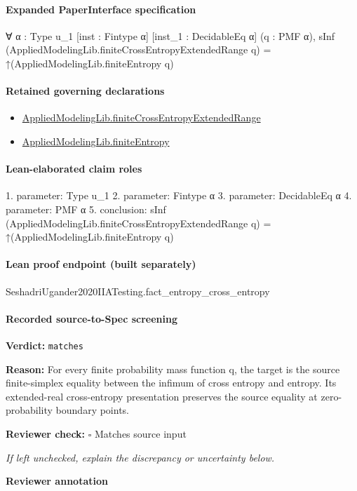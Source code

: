 \documentclass[10pt]{article}
\newcommand{\reviewerbox}{%
  \par\noindent\fbox{\parbox{0.96\linewidth}{\rule{0pt}{0.38in}}}\par
}
\newcommand{\reviewmatch}[1]{%
  \par\noindent\textbf{Reviewer check:} $\square$\; #1\par
  \noindent\emph{If left unchecked, explain the discrepancy or uncertainty below.}\par
}
\begin{document}
\paragraph{Expanded PaperInterface specification}
\begin{ReviewVerbatim}
∀ {α : Type u_1} [inst : Fintype α] [inst_1 : DecidableEq α] (q : PMF α),
  sInf (AppliedModelingLib.finiteCrossEntropyExtendedRange q) = ↑(AppliedModelingLib.finiteEntropy q)
\end{ReviewVerbatim}

\paragraph{Retained governing declarations}
\begin{itemize}\raggedright
\item \hyperlink{library-prerequisite-71929458e0903ffd}{Applied\allowbreak{}Modeling\allowbreak{}Lib.\allowbreak{}finite\allowbreak{}Cross\allowbreak{}Entropy\allowbreak{}Extended\allowbreak{}Range}
\item \hyperlink{library-prerequisite-99c551a488e46a7c}{Applied\allowbreak{}Modeling\allowbreak{}Lib.\allowbreak{}finite\allowbreak{}Entropy}
\end{itemize}
\paragraph{Lean-elaborated claim roles}\begin{ReviewVerbatim}
1. parameter: Type u_1
2. parameter: Fintype α
3. parameter: DecidableEq α
4. parameter: PMF α
5. conclusion: sInf (AppliedModelingLib.finiteCrossEntropyExtendedRange q) = ↑(AppliedModelingLib.finiteEntropy q)
\end{ReviewVerbatim}

\paragraph{Lean proof endpoint (built separately)}\begin{ReviewVerbatim}
SeshadriUgander2020IIATesting.fact_entropy_cross_entropy
\end{ReviewVerbatim}

\paragraph{Recorded source-to-Spec screening}
\textbf{Verdict:} \texttt{matches}
\\
{\raggedright
\textbf{Reason:} For every finite probability mass function q, the target is the source finite-\allowbreak{}simplex equality between the infimum of cross entropy and entropy.\allowbreak{} Its extended-\allowbreak{}real cross-\allowbreak{}entropy presentation preserves the source equality at zero-\allowbreak{}probability boundary points.\allowbreak{}
\par}
\reviewmatch{Matches source input}
\noindent\textbf{Reviewer annotation}\par
\reviewerbox
\clearpage
\hypertarget{source-claim-a54c3d0e5ebe4426}{}
\end{document}
